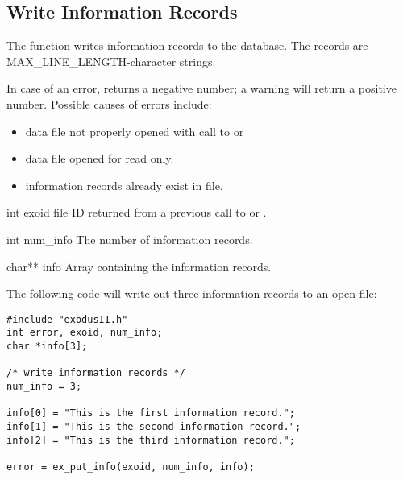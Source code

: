 \subsection{Write Information Records}

The function  writes information records to the
database. The records are MAX_LINE_LENGTH-character strings.

In case of an error,  returns a negative number;
a warning will return a positive number. Possible causes of errors
include:

\begin{itemize}

 \item data file not properly opened with call to 
 or 

 \item data file opened for read only.

 \item information records already exist in file.
\end{itemize}



\begin{parameters}
\item[{int exoid \R{}}]
\exo{} file ID returned from a previous call to  or
.


\item[{int num_info \R{}}]
The number of information records.


\item[{char** info \R{}}]
Array containing the information records.
\end{parameters}

The following code will write out three information records
to an open \exo{} file:

\begin{lstlisting}
#include "exodusII.h"
int error, exoid, num_info;
char *info[3];

/* write information records */
num_info = 3;

info[0] = "This is the first information record.";
info[1] = "This is the second information record.";
info[2] = "This is the third information record.";

error = ex_put_info(exoid, num_info, info);
\end{lstlisting}

